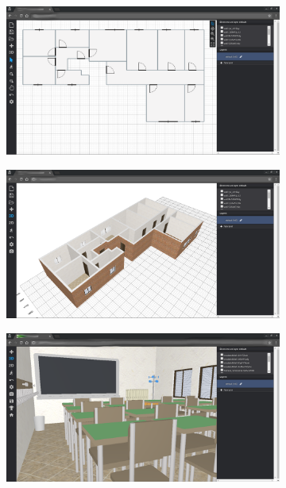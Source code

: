 \begin{figure}[htbp]
\begin{subfigure}[b]{0.329\textwidth}
   \caption{}
   \label{fig3D-palace}
   \end{subfigure}
   
   
   \begin{subfigure}[b]{0.329\textwidth}
   \includegraphics[width=\textwidth]{contents/images/fig-pianta}
   \caption{}
   \label{fig2D}
   \end{subfigure}
   \begin{subfigure}[b]{0.329\textwidth}
   \includegraphics[width=\textwidth]{contents/images/fig-pianta-3d}
   \caption{}
   \label{fig3D} 
   \end{subfigure}
   \begin{subfigure}[b]{0.329\textwidth}
   \includegraphics[width=\textwidth]{contents/images/3d-school}
   \caption{}
   \label{fig3D-school}
   \end{subfigure}
   

\end{figure}
